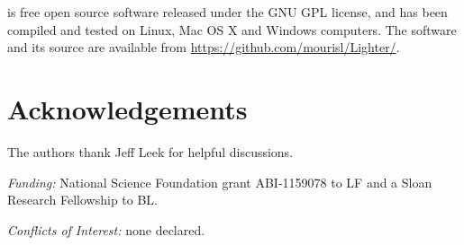 \documentclass{bmcart}
\begin{document}
\tool is free open source software released under the GNU GPL license, and has been compiled and tested on Linux, Mac OS X and Windows computers.  The software and its source are available from \url{https://github.com/mourisl/Lighter/}.

\section*{Acknowledgements}
The authors thank Jeff Leek for helpful discussions.

\noindent\emph{Funding:} National Science Foundation grant ABI-1159078 to LF and a Sloan Research Fellowship to BL.

\noindent\emph{Conflicts of Interest:} none declared.



\end{document}
